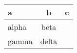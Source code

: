 \begin{table}
\centering
\begin{tabular}{lc|r|}
\toprule
a 	 & b 	 & c \\
\midrule
alpha 	 & beta 	 &  \\ 	 %
gamma 	 & delta 	 &  \\ 	 %
\bottomrule
\end{tabular}
\end{table}